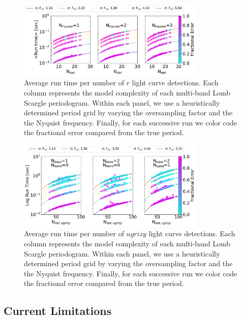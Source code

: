 \documentclass[DM,authoryear,toc]{lsstdoc}
\begin{document}
 
 \begin{figure}
  \includegraphics[width=0.8\textwidth]{figures/singleRUN_LSP_RRL.pdf}
  \centering 
  \caption{Average run time per number of $r$ light curve detections. Each column represents the model complexity of each multi-band Lomb Scargle periodogram. Within each panel, we use a heuristically determined period grid by varying the oversampling factor and the the Nyquist frequency.  Finally, for each successive run we color code the fractional error compared from the true period.}
  \label{fig:run_time_single}
\end{figure}



\begin{figure}
  \includegraphics[width=0.8\textwidth]{figures/multi-lsp-runs.pdf}
  \centering 
  \caption{Average run time per number of $ugrizy$ light curve detections. Each column represents the model complexity of each multi-band Lomb Scargle periodogram. Within each panel, we use a heuristically determined period grid by varying the oversampling factor and the the Nyquist frequency.  Finally, for each successive run we color code the fractional error compared from the true period.}
\end{figure}

\subsection{Current Limitations}\label{sec:limitations}
\end{document}
